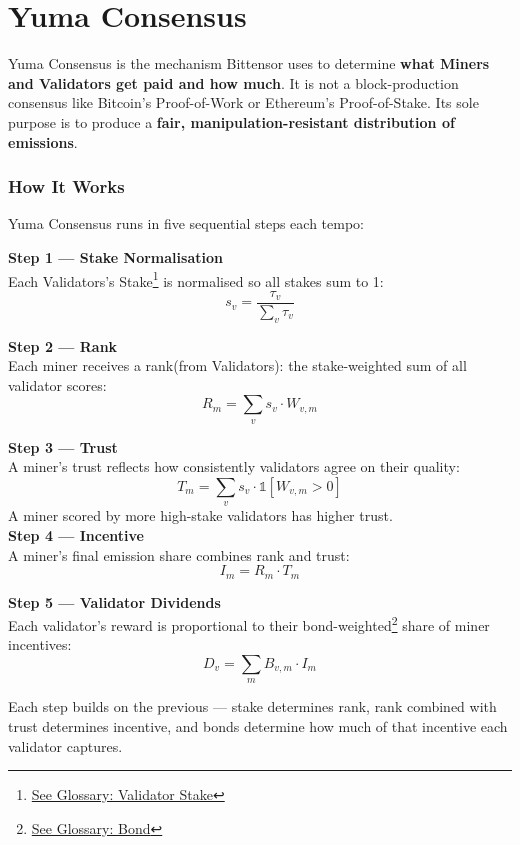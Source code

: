 \documentclass[12pt, a4paper, oneside]{report}
\theoremstyle{definition}
\begin{document}
\section{Yuma Consensus}

Yuma Consensus is the mechanism Bittensor uses to determine \textbf{what Miners and Validators get paid 
and how much}. It is not a block-production consensus like Bitcoin's Proof-of-Work 
or Ethereum's Proof-of-Stake. Its sole purpose is to produce a \textbf{fair, 
manipulation-resistant distribution of emissions}.\\[0.4cm]




\subsubsection*{How It Works}


Yuma Consensus runs in five sequential steps each tempo:

\textbf{Step 1 — Stake Normalisation}\\
Each Validators's Stake\footnote{\hyperref[glossary]{See Glossary: Validator Stake}} is normalised so all stakes sum to 1:
\[
  s_v = \frac{\tau_v}{\sum_{v} \tau_v}
\]

\textbf{Step 2 — Rank}\\
Each miner receives a rank(from Validators): the stake-weighted sum of all validator scores:
\[
  R_m = \sum_{v} s_v \cdot W_{v,m}
\]

\textbf{Step 3 — Trust}\\
A miner's trust reflects how consistently validators agree on their quality:
\[
  T_m = \sum_{v} s_v \cdot \mathbb{1}\left[W_{v,m} > 0\right]
\]
A miner scored by more high-stake validators has higher trust.\\[0.4cm]

\textbf{Step 4 — Incentive}\\
A miner's final emission share combines rank and trust:
\[
  I_m = R_m \cdot T_m
\]

\textbf{Step 5 — Validator Dividends}\\
Each validator's reward is proportional to their bond-weighted\footnote{\hyperref[glossary]{See Glossary: Bond}} share of miner incentives:
\[
  D_v = \sum_{m} B_{v,m} \cdot I_m
\]

\noindent Each step builds on the previous — stake determines rank, rank combined 
with trust determines incentive, and bonds determine how much of that incentive 
each validator captures.
\end{document}
